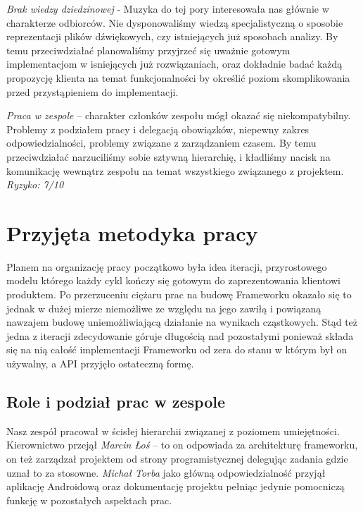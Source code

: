 \noindent\emph{Brak wiedzy dziedzinowej} - Muzyka do tej pory interesowała nas głównie w charakterze odbiorców. Nie dysponowaliśmy wiedzą specjalistyczną o sposobie reprezentacji plików dźwiękowych, czy istniejących już sposobach analizy. By temu przeciwdziałać planowaliśmy przyjrzeć się uważnie gotowym implementacjom w isniejących już rozwiązaniach, oraz dokładnie badać każdą propozycję klienta na temat funkcjonalności by określić poziom skomplikowania przed przystąpieniem do implementacji.

\noindent\emph{Praca w zespole} -- charakter członków zespołu mógł okazać się niekompatybilny. Problemy z podziałem pracy i delegacją obowiązków, niepewny zakres odpowiedzialności, problemy związane z zarządzaniem czasem. By temu przeciwdziałać narzuciliśmy sobie sztywną hierarchię, i kładliśmy nacisk na komunikację wewnątrz zespołu na temat wszystkiego związanego z projektem. \emph{Ryzyko: 7/10} 

\chapter{Przyjęta metodyka pracy}

Planem na organizację pracy początkowo była idea iteracji, przyrostowego modelu którego każdy cykl
kończy się gotowym do zaprezentowania klientowi produktem. Po przerzuceniu ciężaru prac na budowę
Frameworku okazało się to jednak w dużej mierze niemożliwe ze względu na jego zawiłą i powiązaną
nawzajem budowę uniemożliwiającą działanie na wynikach cząstkowych. Stąd też jedna z iteracji
zdecydowanie góruje długością nad pozostałymi ponieważ składa się na nią całość implementacji
Frameworku od zera do stanu w którym był on używalny, a API przyjęło ostateczną formę.

\section{Role i podział prac w zespole}

Nasz zespół pracował w ścisłej hierarchii związanej z poziomem umiejętności. Kierownictwo przejął
\emph{Marcin Łoś} -- to on odpowiada za architekturę frameworku, on też zarządzał projektem od
strony programistycznej delegując zadania gdzie uznał to za stosowne. \emph{Michał Torba} jako
główną odpowiedzialność przyjął aplikację Androidową oraz dokumentację projektu pełniąc jedynie
pomocniczą funkcję w pozostałych aspektach prac.

